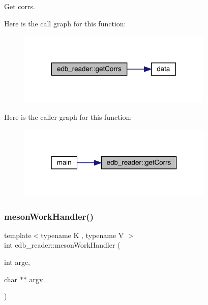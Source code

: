 Get corrs. 

Here is the call graph for this function\+:
\nopagebreak
\begin{figure}[H]
\begin{center}
\leavevmode
\includegraphics[width=263pt]{d8/d4f/namespaceedb__reader_acda70ebf60da73d7caecba719cb087a3_cgraph}
\end{center}
\end{figure}
Here is the caller graph for this function\+:
\nopagebreak
\begin{figure}[H]
\begin{center}
\leavevmode
\includegraphics[width=265pt]{d8/d4f/namespaceedb__reader_acda70ebf60da73d7caecba719cb087a3_icgraph}
\end{center}
\end{figure}
\mbox{\label{namespaceedb__reader_a652a00afe7723e5e5cb678177917f3c1}} 
\subsubsection{\texorpdfstring{mesonWorkHandler()}{mesonWorkHandler()}\hspace{0.1cm}{\footnotesize\ttfamily [1/2]}}
{\footnotesize\ttfamily template$<$typename K , typename V $>$ \\
int edb\+\_\+reader\+::meson\+Work\+Handler (\begin{DoxyParamCaption}\item[{int}]{argc,  }\item[{char $\ast$$\ast$}]{argv }\end{DoxyParamCaption})}

